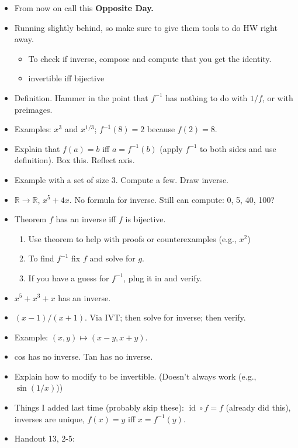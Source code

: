 \documentclass[12pt]{article}
\DeclareMathOperator{\id}{id}
\newcommand{\R}{{\mathbb R}}
\begin{document}
\begin{itemize}
\item From now on call this \textbf{Opposite Day.}
\item Running slightly behind, so make sure to give them tools to do HW right away.
  \begin{itemize}
  \item To check if inverse, compose and compute that you get the identity.
  \item invertible iff bijective
\end{itemize}
\item Definition. Hammer in the point that $f^{-1}$ has nothing to do with $1/f$, or with preimages.
\item Examples: $x^3$ and $x^{1/3}$; $f^{-1}(8) = 2$ because $f(2) = 8$. 
\item Explain that $f(a) = b$ iff $a = f^{-1}(b)$ (apply $f^{-1}$ to both sides and use definition). Box this. Reflect axis. 
\item Example with a set of size 3. Compute a few. Draw inverse. 
\item $\mathbb{R}\to \R$, $x^5 + 4x$. No formula for inverse. Still can compute: 0, 5, 40, 100?
\item Theorem $f$ has an inverse iff $f$ is bijective. 
  \begin{enumerate}   
  \item Use theorem to help with proofs or counterexamples (e.g., $x^2$)
  \item To find $f^{-1}$ fix $f$ and solve for $g$.
  \item If you have a guess for $f^{-1}$, plug it in and verify.
  \end{enumerate}
\item $x^5 + x^3 + x$ has an inverse.

\item $(x-1)/(x+1)$. Via IVT; then solve for inverse; then verify.
\item Example: $(x,y) \mapsto (x-y, x+y)$.
\item cos has no inverse. Tan has no inverse. 
\item Explain how to modify to be invertible. (Doesn't always work (e.g., $\sin(1/x)$))
\item Things I added last time (probably skip these): $\id \circ f = f$ (already did this), inverses are unique, $f(x) = y$ iff $x = f^{-1}(y)$.

\item Handout 13, 2-5:
  

\end{itemize}
\end{document}
